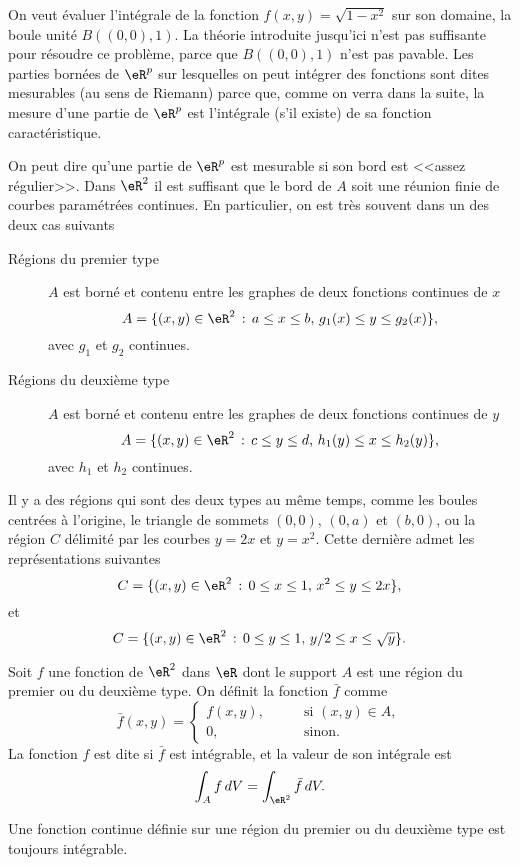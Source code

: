 On veut évaluer l'intégrale de la fonction $f(x,y)=\sqrt{1-x^2}$ sur son domaine, la boule unité $B((0,0),1)$. La théorie introduite jusqu'ici n'est pas suffisante pour résoudre  ce problème, parce que $B((0,0),1)$ n'est pas pavable. Les parties bornées de $\eR^p$ sur lesquelles on peut intégrer des fonctions sont dites mesurables (au sens de Riemann) parce que, comme on verra dans la suite, la mesure d'une partie de $\eR^p$ est l'intégrale (s'il existe) de sa fonction caractéristique.

On peut dire qu'une partie de $\eR^p$  est mesurable si son bord est <<assez régulier>>. Dans $\eR^2$ il est suffisant que le bord de $A$ soit une réunion finie de courbes paramétrées continues. En particulier, on est très souvent dans un des deux cas suivants
\begin{description}
\item[Régions du premier type] $A$ est borné et contenu entre les graphes de deux fonctions continues de $x$
\[
A=\{(x,y)\in\eR^2 \,:\, a\leq x\leq b, \, g_1(x)\leq y\leq g_2(x)\},
\]
avec $g_1$ et $g_2$ continues.
\item[Régions du deuxième type] $A$ est borné et contenu entre les graphes de deux fonctions continues de $y$
\[
A=\{(x,y)\in\eR^2 \,:\, c\leq y\leq d, \, h_1(y)\leq x\leq h_2(y)\},
\]
avec $h_1$ et $h_2$ continues.
\end{description}
\newcommand{\CaptionFigRegioniPrimoeSecondoTipo}{Régions du premier et du deuxième type}


\begin{example}
 Il y a des régions qui sont des deux types au même temps, comme les boules centrées à l'origine, le triangle de sommets  $(0,0)$, $(0,a)$ et $(b,0)$, ou la région $C$ délimité par les courbes $y=2x$ et $y=x^2$. Cette dernière admet les représentations suivantes
\[
C= \{(x,y)\in\eR^2 \,:\, 0\leq x\leq 1, \, x^2\leq y\leq 2x\},
\]
et
\[
C= \{(x,y)\in\eR^2 \,:\, 0\leq y\leq 1, \, y/2\leq x\leq \sqrt{y}\}.
\]
\end{example}
\begin{definition}
  Soit $f$ une fonction de $\eR^2$ dans $\eR$ dont le support  $A$ est une région du premier ou du deuxième type. On définit la fonction $\bar f$ comme
 \begin{equation}
 \bar f(x,y) = \left\{ \begin{array}{ll}
     f(x,y), \qquad & \textrm{si } (x,y)\in A,\\
  0 , & \textrm{sinon.}
    \end{array}\right.
  \end{equation}
  La fonction $f$ est dite  si $\bar f$ est intégrable, et la valeur de son intégrale est
\[
\int_A f\, dV=\int_{\eR^2} \bar f\, dV.
\]
\end{definition}
Une fonction continue définie sur une région du premier ou du deuxième type est toujours intégrable.

